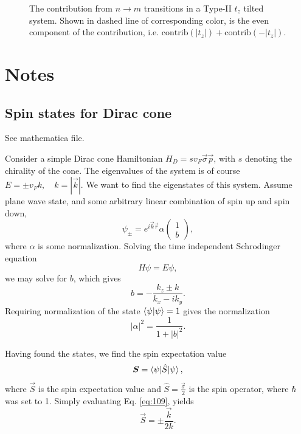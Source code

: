 \begin{figure}[ht]
{
  } %
  \caption{The contribution from \( n\to m \) transitions in a Type-II \(t_z\) tilted system.
    Shown in dashed line of corresponding color, is the even component of the contribution, i.e. \( \text{contrib}(|t_z|) + \text{contrib}(-|t_z|) \).
  }
  \label{fig:contribtzII}
\end{figure}

\section{Notes}
\subsection{Spin states for Dirac cone}
See mathematica file.

Consider a simple Dirac cone Hamiltonian \(H_{D} = s v_{F} \vec{\sigma} \vec{p}\), with \(s\) denoting the chirality of the cone.
The eigenvalues of the system is of course \(E = \pm v_{F} k, \quad k=|\vec{k}|\).
We want to find the eigenstates of this system.
Assume plane wave state, and some arbitrary linear combination of spin up and spin down,
\[
  \psi _{\pm} = e^{i \vec{k} \vec{r}} \alpha
  \begin{pmatrix}
    1\\
    b
  \end{pmatrix},
\]
where \(\alpha \) is some normalization.
Solving the time independent Schrodinger equation
\[
H \psi = E \psi,
\]
we may solve for \(b\), which gives
\begin{equation}
  \label{eq:108}
  b = -\frac{k_{z} \pm k}{k_{x} - i k_{y}}.
\end{equation}
Requiring normalization of the state \(\braket{\psi | \psi } = 1\) gives the normalization
\[
|\alpha |^2 = \frac{1}{1 + |b|^2}.
\]

Having found the states, we find the spin expectation value
\begin{equation}
  \label{eq:109}
  \bm{S} = \braket{\psi | \hat{S} | \psi },
\end{equation}
where \(\vec{S}\) is the spin expectation value and \(\hat{S} = \frac{\vec{\sigma}}{2} \) is the spin operator, where \(\hbar \) was set to 1.
Simply evaluating Eq. \eqref{eq:109}, yields
\begin{equation}
  \label{eq:110}
  \vec{S} = \pm \frac{\vec{k}}{2 k}.
\end{equation}

